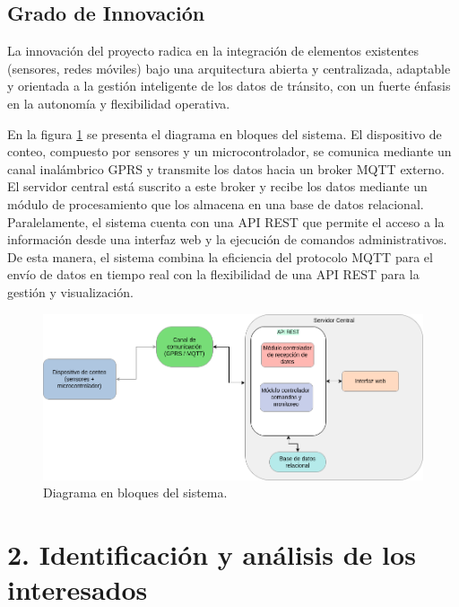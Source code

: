\documentclass[
11pt, %
]{charter}
\begin{document}
\subsection{Grado de Innovación}
La innovación del proyecto radica en la integración de elementos existentes (sensores, redes móviles) bajo una arquitectura abierta y centralizada, adaptable y orientada a la gestión inteligente de los datos de tránsito, con un fuerte énfasis en la autonomía y flexibilidad operativa.


En la figura \ref{fig:diagBloques} se presenta el diagrama en bloques del sistema. El dispositivo de conteo, compuesto por sensores y un microcontrolador, se comunica mediante un canal inalámbrico GPRS y transmite los datos hacia un broker MQTT externo. El servidor central está suscrito a este broker y recibe los datos mediante un módulo de procesamiento que los almacena en una base de datos relacional. Paralelamente, el sistema cuenta con una API REST que permite el acceso a la información desde una interfaz web y la ejecución de comandos administrativos. De esta manera, el sistema combina la eficiencia del protocolo MQTT para el envío de datos en tiempo real con la flexibilidad de una API REST para la gestión y visualización.

\begin{figure}[htpb]
\centering 
\includegraphics[width=.90\textwidth]{./Figuras/diagBloques.png}
\caption{Diagrama en bloques del sistema.}
\label{fig:diagBloques}
\end{figure}

\vspace{25px}


\section{2. Identificación y análisis de los interesados}
\label{sec:interesados}
\end{document}
